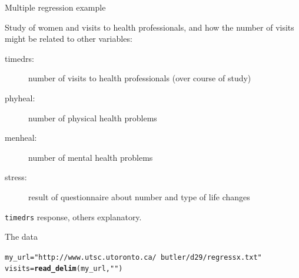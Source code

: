 \documentclass[unknownkeysallowed]{beamer}\usepackage[]{graphicx}\usepackage[]{color}
\makeatletter
\newcommand{\hlstr}[1]{\textcolor[rgb]{0.192,0.494,0.8}{#1}}%
\newcommand{\hlstd}[1]{\textcolor[rgb]{0.345,0.345,0.345}{#1}}%
\newcommand{\hlkwb}[1]{\textcolor[rgb]{0.69,0.353,0.396}{#1}}%
\newcommand{\hlkwd}[1]{\textcolor[rgb]{0.737,0.353,0.396}{\textbf{#1}}}%
\newenvironment{kframe}{%
 \def\at@end@of@kframe{}%
 \ifinner\ifhmode%
  \def\at@end@of@kframe{\end{minipage}}%
  \begin{minipage}{\columnwidth}%
 \fi\fi%
 \def\FrameCommand##1{\hskip\@totalleftmargin \hskip-\fboxsep
 \colorbox{shadecolor}{##1}\hskip-\fboxsep
     \hskip-\linewidth \hskip-\@totalleftmargin \hskip\columnwidth}%
 \MakeFramed {\advance\hsize-\width
   \@totalleftmargin\z@ \linewidth\hsize
   \@setminipage}}%
 {\par\unskip\endMakeFramed%
 \at@end@of@kframe}
\newenvironment{knitrout}{}{} %
\makeatother
\begin{document}
\begin{frame}[fragile]{Multiple regression example}

Study of women and visits to health professionals, and how the number of visits might be related to other variables:

\begin{description}
\item[timedrs:] number of visits to health professionals (over course of study)
\item[phyheal:] number of physical health problems
\item[menheal:] number of mental health problems
\item[stress:] result of questionnaire about number and type of life changes
\end{description}

\verb-timedrs- response, others explanatory.

\end{frame}

\begin{frame}[fragile]{The data}

 
\begin{knitrout}
\color{fgcolor}\begin{kframe}
\begin{alltt}
\hlstd{my_url}\hlkwb{=}\hlstr{"http://www.utsc.utoronto.ca/~butler/d29/regressx.txt"}
\hlstd{visits}\hlkwb{=}\hlkwd{read_delim}\hlstd{(my_url,}\hlstr{" "}\hlstd{)}
\end{alltt}


{\ttfamily\noindent\itshape\color{messagecolor}{\#\# Parsed with column specification:\\\#\# cols(\\\#\#\ \  subjno = col\_integer(),\\\#\#\ \  timedrs = col\_integer(),\\\#\#\ \  phyheal = col\_integer(),\\\#\#\ \  menheal = col\_integer(),\\\#\#\ \  stress = col\_integer()\\\#\# )}}\end{kframe}
\end{knitrout}
  


\end{frame}
\end{document}
